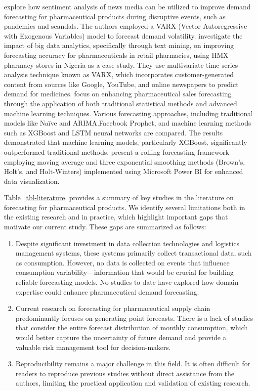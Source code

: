 \documentclass[
  authoryear,
  preprint,
  3p]{elsarticle}
\begin{document}
\citet{nguyen2023managing} explore how sentiment analysis of news media
can be utilized to improve demand forecasting for pharmaceutical
products during disruptive events, such as pandemics and scandals. The
authors employed a VARX (Vector Autoregressive with Exogenous Variables)
model to forecast demand volatility. \citet{papanagnou2018coping}
investigate the impact of big data analytics, specifically through text
mining, on improving forecasting accuracy for pharmaceuticals in retail
pharmacies, using HMX pharmacy stores in Nigeria as a case study. They
use multivariate time series analysis technique known as VARX, which
incorporates customer-generated content from sources like Google,
YouTube, and online newspapers to predict demand for medicines.
\citet{fourkiotis2024applying} focus on enhancing pharmaceutical sales
forecasting through the application of both traditional statistical
methods and advanced machine learning techniques. Various forecasting
approaches, including traditional models like Naïve and ARIMA,Facebook
Prophet, and machine learning methods such as XGBoost and LSTM neural
networks are compared. The results demonstrated that machine learning
models, particularly XGBoost, significantly outperformed traditional
methods. \citet{belghith2024new} present a rolling forecasting framework
employing moving average and three exponential smoothing methods
(Brown's, Holt's, and Holt-Winters) implemented using Microsoft Power BI
for enhanced data visualization.

Table~\ref{tbl-literature} provides a summary of key studies in the
literature on forecasting for pharmaceutical products. We identify
several limitations both in the existing research and in practice, which
highlight important gaps that motivate our current study. These gaps are
summarized as follows:

\begin{enumerate}
\def\labelenumi{\arabic{enumi}.}
\item
  Despite significant investment in data collection technologies and
  logistics management systems, these systems primarily collect
  transactional data, such as consumption. However, no data is collected
  on events that influence consumption variability---information that
  would be crucial for building reliable forecasting models. No studies
  to date have explored how domain expertise could enhance
  pharmaceutical demand forecasting.
\item
  Current research on forecasting for pharmaceutical supply chain
  predominantly focuses on generating point forecasts. There is a lack
  of studies that consider the entire forecast distribution of monthly
  consumption, which would better capture the uncertainty of future
  demand and provide a valuable risk management tool for
  decision-makers.
\item
  Reproducibility remains a major challenge in this field. It is often
  difficult for readers to reproduce previous studies without direct
  assistance from the authors, limiting the practical application and
  validation of existing research.
\end{enumerate}
\end{document}
